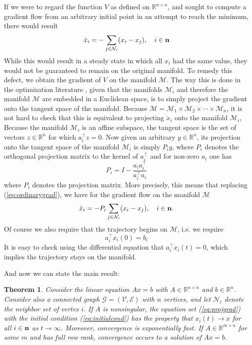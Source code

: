 \documentclass{aims}
\newtheorem{thm}{\textbf{Theorem}}
\def\n{{\bf n}}
\begin{document}
If we were to regard the function $V$ as defined on
 $\mathbb R^{n\times n}$, and sought to compute a gradient flow from an arbitrary initial point in an attempt to reach the minimum, there would result
\begin{equation}\label{eq:ordinarygrad}
\dot x_i=-\sum_{j\in \mathcal N_i}(x_i-x_j),\quad i\in \n
\end{equation}
While this would result in a steady state in which all $x_i$ had the
same value, they would not be guaranteed to remain on the original
manifold. To remedy this defect, we obtain the gradient of $V$ on the
manifold $\mathcal M$. The way this is done in the
  optimization literature \cite{UJ94Book,David69}, given that the manifolds
$\mathcal M_i$ and therefore the manifold $\mathcal M$ are embedded in
a Euclidean space, is to simply project the gradient onto the tangent
space of the manifold. Because  $\mathcal M=\mathcal M_1\times \mathcal M_2\times\cdots\times\mathcal M_n$, it is not hard to check that this is equivalent to projecting $\dot x_i$ onto the manifold $\mathcal M_i$, Because the manifold $\mathcal M_i$ is an affine subspace, the tangent space is the set of vectors $z\in\mathbb R^n$ for which $a_i^{\top}z=0$.  Now given an arbitrary $y\in\mathbb R^n$, its projection onto the tangent space of the manifold $\mathcal M_i$ is simply $P_iy$, where $P_i$ denotes the orthogonal projection matrix to the kernel of $a_i^{\top}$ and for non-zero $a_i$ one has
\begin{equation}
P_i=I-\frac{a_ia_i^{\top}}{a_i^{\top}a_i}
\end{equation}
where $P_i$ denotes the projection matrix.
More precisely, this means that replacing (\ref{eq:ordinarygrad}), we have for the gradient flow on the manifold $\mathcal M$
\begin{equation}\label{eq:projgrad}
\dot x_i=-P_i\sum_{j\in \mathcal N_i}(x_i-x_j),\quad i\in \n.
\end{equation}
Of course we also require that the trajectory begins on $\mathcal M$, i.e. we require
\begin{equation}\label{eq:initialcond}
a_i^{\top}x_i(0)=b_i
\end{equation}
It is easy to check using the differential equation that $a_i^{\top}\dot x_i(t)=0$, which implies the trajectory stays on the manifold.

And now we can state the main result:
\begin{thm}\label{Thm_main}
Consider the linear equation $Ax=b$ with $A\in\mathbb R^{n\times n}$ and
$b\in \mathbb R^n$. Consider also a connected graph $\mathcal
G=(\mathcal V, \mathcal E)$ with $n$ vertices, and let $\mathcal N_i$
denote the neighbor set of vertex $i$. If $A$ is nonsingular, the
equation set (\ref{eq:projgrad}) with the initial condition (\ref{eq:initialcond}) has the property that $x_i(t)\rightarrow x$ for all $i\in \n$ as $t\rightarrow\infty$. Moreover, convergence is exponentially fast.  If $A \in\mathbb R^{m\times n}$ for some $m$ and has full row rank, convergence occurs to a solution of $Ax=b$.
\end{thm}
\end{document}
